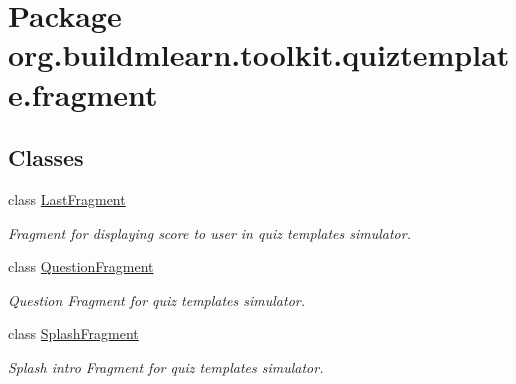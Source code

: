 \hypertarget{namespaceorg_1_1buildmlearn_1_1toolkit_1_1quiztemplate_1_1fragment}{}\section{Package org.\+buildmlearn.\+toolkit.\+quiztemplate.\+fragment}
\label{namespaceorg_1_1buildmlearn_1_1toolkit_1_1quiztemplate_1_1fragment}
\subsection*{Classes}
\begin{DoxyCompactItemize}
\item 
class \hyperlink{classorg_1_1buildmlearn_1_1toolkit_1_1quiztemplate_1_1fragment_1_1LastFragment}{Last\+Fragment}
\begin{DoxyCompactList}\small\item\em Fragment for displaying score to user in quiz template\textquotesingle{}s simulator. \end{DoxyCompactList}\item 
class \hyperlink{classorg_1_1buildmlearn_1_1toolkit_1_1quiztemplate_1_1fragment_1_1QuestionFragment}{Question\+Fragment}
\begin{DoxyCompactList}\small\item\em Question Fragment for quiz template\textquotesingle{}s simulator. \end{DoxyCompactList}\item 
class \hyperlink{classorg_1_1buildmlearn_1_1toolkit_1_1quiztemplate_1_1fragment_1_1SplashFragment}{Splash\+Fragment}
\begin{DoxyCompactList}\small\item\em Splash intro Fragment for quiz template\textquotesingle{}s simulator. \end{DoxyCompactList}\end{DoxyCompactItemize}
